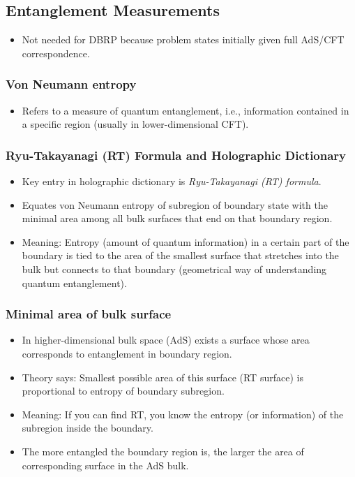 \documentclass{article}
\begin{document}
\subsection{Entanglement Measurements}
\begin{itemize}
    \item Not needed for DBRP because problem states initially given full AdS/CFT correspondence.
\end{itemize}

\subsubsection*{Von Neumann entropy}
\begin{itemize}
    \item Refers to a measure of quantum entanglement, i.e., information contained in a specific region (usually in lower-dimensional CFT).
\end{itemize}

\subsubsection*{Ryu-Takayanagi (RT) Formula and Holographic Dictionary}
\begin{itemize}
    \item Key entry in holographic dictionary is \textit{Ryu-Takayanagi (RT) formula}.
    \item Equates von Neumann entropy of subregion of boundary state with the minimal area among all bulk surfaces that end on that boundary region.
    \item Meaning: Entropy (amount of quantum information) in a certain part of the boundary is tied to the area of the smallest surface that stretches into the bulk but connects to that boundary (geometrical way of understanding quantum entanglement).
\end{itemize}

\subsubsection*{Minimal area of bulk surface}
\begin{itemize}
    \item In higher-dimensional bulk space (AdS) exists a surface whose area corresponds to entanglement in boundary region.
    \item Theory says: Smallest possible area of this surface (RT surface) is proportional to entropy of boundary subregion.
    \item Meaning: If you can find RT, you know the entropy (or information) of the subregion inside the boundary.
    \item The more entangled the boundary region is, the larger the area of corresponding surface in the AdS bulk.
\end{itemize}
\end{document}
